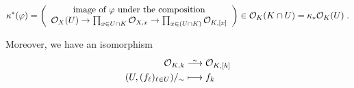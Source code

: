 \documentclass[a4paper,parskip=half,numbers=enddot, DIV=12]{scrreprt}
\begin{document}
\begin{prop}
\begin{itemize}
       \begin{align*}
       	\kappa^*(\phi)=\left(
       	\begin{array}{c}
	       	\text{image of }\phi\text{ under the composition}\\
	       	\Oo_X(U) \morphism \prod_{x\in U\cap K} \Oo_{X,x} \morphism \prod_{x\in (U\cap K)} \Oo_{K,[x]}
       	\end{array}\right)\in\Oo_K(K\cap U)=\kappa_*\Oo_K(U)\;.
       \end{align*} 
    \end{itemize}
    Moreover, we have an isomorphism
    \begin{align*}
    \Oo_{K,k} &\isomorphism \Oo_{K,[k]}\\
    (U,(f_\ell)_{\ell\in U})/_\sim &\longmapsto f_k
    \end{align*}
\end{prop}
\end{document}
